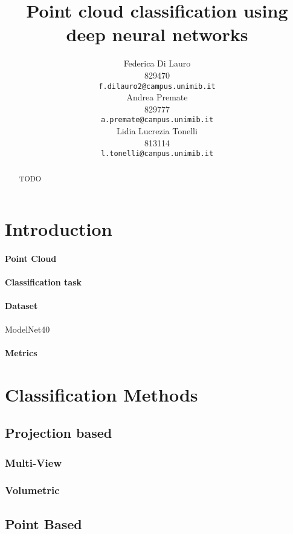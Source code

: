 \documentclass{article}
\title{Point cloud classification using deep neural networks}
\author{
 Federica Di Lauro \\
  829470\\
  \texttt{f.dilauro2@campus.unimib.it} \\
   \And
  Andrea Premate \\
  829777\\
  \texttt{a.premate@campus.unimib.it} \\
  \And
  Lidia Lucrezia Tonelli \\
  813114\\
  \texttt{l.tonelli@campus.unimib.it} \\
}
\begin{document}
\maketitle
\begin{abstract}
TODO
\end{abstract}

\section{Introduction}

\cite{lu2020deep}

\paragraph{Point Cloud}

\paragraph{Classification task}

\paragraph{Dataset}

ModelNet40 \cite{ShapeNets}

\paragraph{Metrics}

\section{Classification Methods}

\subsection{Projection based}

\subsubsection{Multi-View}
\subsubsection{Volumetric}

\subsection{Point Based}
\end{document}
